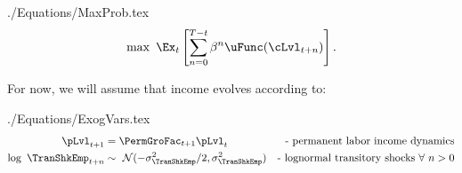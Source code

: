 \documentclass[titlepage, headings=optiontotocandhead]{\econtex}
\begin{document}
\begin{verbatimwrite}{./Equations/MaxProb.tex}
  \begin{equation}\label{eq:MaxProb}
    \max ~ \Ex_{t}\left[ \sum_{n=0}^{T-t} {\DiscAlt}^{n} \uFunc({\cLvl}_{t+n})\right].
  \end{equation}
\end{verbatimwrite}
\unskip

For now, we will assume that income evolves according to: 
\begin{verbatimwrite}{./Equations/ExogVars.tex}
  \begin{equation}\begin{gathered}\begin{aligned}
         \pLvl_{t+1}  & = \PermGroFac_{t+1}\pLvl_{t} &   \text{- permanent labor income dynamics} \label{eq:permincgrow} 
        \\ \log ~ \TranShkEmp_{t+n} & \sim ~\mathcal{N}(-\sigma_{\TranShkEmp}^{2}/2,\sigma_{\TranShkEmp}^{2}) & \text{- lognormal transitory shocks}~\forall~n>0 
      \end{aligned}\end{gathered}\end{equation}
\end{verbatimwrite}
\unskip
\end{document}
